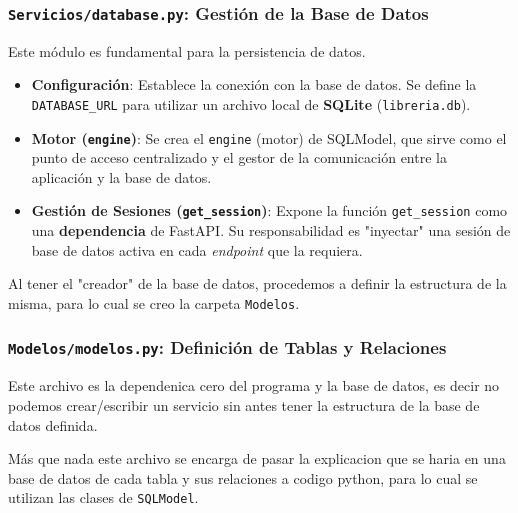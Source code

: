 \documentclass[12pt]{article}
\begin{document}
\subsubsection*{\texttt{Servicios/database.py}: Gestión de la Base de Datos}
Este módulo es fundamental para la persistencia de datos.
\begin{itemize}
    \item \textbf{Configuración}: Establece la conexión con la base de datos. Se define la \texttt{DATABASE\_URL} para utilizar un archivo local de \textbf{SQLite} (\texttt{libreria.db}).
    \item \textbf{Motor (\texttt{engine})}: Se crea el \texttt{engine} (motor) de SQLModel, que sirve como el punto de acceso centralizado y el gestor de la comunicación entre la aplicación y la base de datos.
    \item \textbf{Gestión de Sesiones (\texttt{get\_session})}: Expone la función \texttt{get\_session} como una \textbf{dependencia} de FastAPI. Su responsabilidad es "inyectar" una sesión de base de datos activa en cada \textit{endpoint} que la requiera.
\end{itemize}

Al tener el "creador" de la base de datos, procedemos a definir la estructura de la misma, para lo cual se creo la carpeta \texttt{Modelos}.
\subsubsection*{\texttt{Modelos/modelos.py}: Definición de Tablas y Relaciones}
Este archivo es la dependenica cero del programa y la base de datos, es decir no podemos crear/escribir un servicio sin antes tener la estructura de la base de datos definida.

Más que nada este archivo se encarga de pasar la explicacion que se haria en una base de datos de cada tabla y sus relaciones a codigo python, para lo cual se utilizan las clases de \texttt{SQLModel}.
\end{document}
